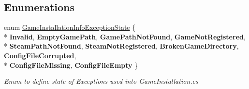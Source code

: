 \subsection*{Enumerations}
\begin{DoxyCompactItemize}
\item 
\hypertarget{namespace_s_e_mod_a_p_i_1_1_a_p_i_a3f4cfe5de907809759771199bcd04878}{}enum \hyperlink{namespace_s_e_mod_a_p_i_1_1_a_p_i_a3f4cfe5de907809759771199bcd04878}{Game\+Installation\+Info\+Exception\+State} \{ \\*
{\bfseries Invalid}, 
{\bfseries Empty\+Game\+Path}, 
{\bfseries Game\+Path\+Not\+Found}, 
{\bfseries Game\+Not\+Registered}, 
\\*
{\bfseries Steam\+Path\+Not\+Found}, 
{\bfseries Steam\+Not\+Registered}, 
{\bfseries Broken\+Game\+Directory}, 
{\bfseries Config\+File\+Corrupted}, 
\\*
{\bfseries Config\+File\+Missing}, 
{\bfseries Config\+File\+Empty}
 \}\label{namespace_s_e_mod_a_p_i_1_1_a_p_i_a3f4cfe5de907809759771199bcd04878}
\begin{DoxyCompactList}\small\item\em Enum to define state of Exceptions used into Game\+Installation.\+cs \end{DoxyCompactList}
\end{DoxyCompactItemize}
